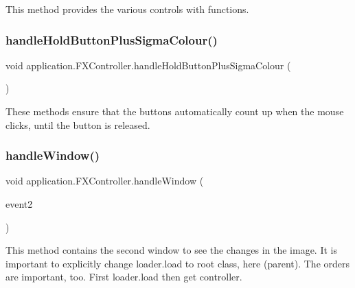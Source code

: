 This method provides the various controls with functions. \mbox{\label{classapplication_1_1_f_x_controller_a43fca4a5dc168068c3e978672324fb31}} 
\subsubsection{\texorpdfstring{handle\+Hold\+Button\+Plus\+Sigma\+Colour()}{handleHoldButtonPlusSigmaColour()}}
{\footnotesize\ttfamily void application.\+F\+X\+Controller.\+handle\+Hold\+Button\+Plus\+Sigma\+Colour (\begin{DoxyParamCaption}{ }\end{DoxyParamCaption})}

These methods ensure that the buttons automatically count up when the mouse clicks, until the button is released. \mbox{\label{classapplication_1_1_f_x_controller_a4ba7818448465dabfafce77571565fb7}} 
\subsubsection{\texorpdfstring{handle\+Window()}{handleWindow()}}
{\footnotesize\ttfamily void application.\+F\+X\+Controller.\+handle\+Window (\begin{DoxyParamCaption}\item[{Action\+Event}]{event2 }\end{DoxyParamCaption})}

This method contains the second window to see the changes in the image. It is important to explicitly change loader.\+load to root class, here (parent). The orders are important, too. First loader.\+load then get controller. \mbox{\label{classapplication_1_1_f_x_controller_a1aa99fad0d86d829a852e17712a5029a}} 

